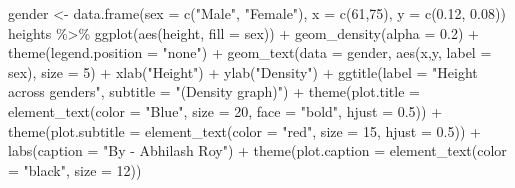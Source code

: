 \documentclass[
]{article}
\newenvironment{Shaded}{\begin{snugshade}}{\end{snugshade}}
\newcommand{\AttributeTok}[1]{\textcolor[rgb]{0.77,0.63,0.00}{#1}}
\newcommand{\DecValTok}[1]{\textcolor[rgb]{0.00,0.00,0.81}{#1}}
\newcommand{\FloatTok}[1]{\textcolor[rgb]{0.00,0.00,0.81}{#1}}
\newcommand{\FunctionTok}[1]{\textcolor[rgb]{0.00,0.00,0.00}{#1}}
\newcommand{\NormalTok}[1]{#1}
\newcommand{\OtherTok}[1]{\textcolor[rgb]{0.56,0.35,0.01}{#1}}
\newcommand{\SpecialCharTok}[1]{\textcolor[rgb]{0.00,0.00,0.00}{#1}}
\newcommand{\StringTok}[1]{\textcolor[rgb]{0.31,0.60,0.02}{#1}}
\begin{document}
\begin{Shaded}
\begin{Highlighting}[]
\NormalTok{gender }\OtherTok{\textless{}{-}} \FunctionTok{data.frame}\NormalTok{(}\AttributeTok{sex =} \FunctionTok{c}\NormalTok{(}\StringTok{"Male"}\NormalTok{, }\StringTok{"Female"}\NormalTok{), }\AttributeTok{x =} \FunctionTok{c}\NormalTok{(}\DecValTok{61}\NormalTok{,}\DecValTok{75}\NormalTok{), }\AttributeTok{y =} \FunctionTok{c}\NormalTok{(}\FloatTok{0.12}\NormalTok{, }\FloatTok{0.08}\NormalTok{))}
\NormalTok{heights }\SpecialCharTok{\%\textgreater{}\%} 
  \FunctionTok{ggplot}\NormalTok{(}\FunctionTok{aes}\NormalTok{(height, }\AttributeTok{fill =}\NormalTok{ sex)) }\SpecialCharTok{+} \FunctionTok{geom\_density}\NormalTok{(}\AttributeTok{alpha =} \FloatTok{0.2}\NormalTok{) }\SpecialCharTok{+}
  \FunctionTok{theme}\NormalTok{(}\AttributeTok{legend.position =} \StringTok{"none"}\NormalTok{) }\SpecialCharTok{+}
  \FunctionTok{geom\_text}\NormalTok{(}\AttributeTok{data =}\NormalTok{ gender, }\FunctionTok{aes}\NormalTok{(x,y, }\AttributeTok{label =}\NormalTok{ sex), }\AttributeTok{size =} \DecValTok{5}\NormalTok{) }\SpecialCharTok{+}
  \FunctionTok{xlab}\NormalTok{(}\StringTok{"Height"}\NormalTok{) }\SpecialCharTok{+} \FunctionTok{ylab}\NormalTok{(}\StringTok{"Density"}\NormalTok{) }\SpecialCharTok{+}
  \FunctionTok{ggtitle}\NormalTok{(}\AttributeTok{label =} \StringTok{"Height across genders"}\NormalTok{, }\AttributeTok{subtitle =} \StringTok{"(Density graph)"}\NormalTok{) }\SpecialCharTok{+}
  \FunctionTok{theme}\NormalTok{(}\AttributeTok{plot.title =} \FunctionTok{element\_text}\NormalTok{(}\AttributeTok{color =} \StringTok{"Blue"}\NormalTok{, }\AttributeTok{size =} \DecValTok{20}\NormalTok{, }
                                  \AttributeTok{face =} \StringTok{"bold"}\NormalTok{, }\AttributeTok{hjust =} \FloatTok{0.5}\NormalTok{)) }\SpecialCharTok{+}
  \FunctionTok{theme}\NormalTok{(}\AttributeTok{plot.subtitle =} \FunctionTok{element\_text}\NormalTok{(}\AttributeTok{color =} \StringTok{"red"}\NormalTok{, }\AttributeTok{size =} \DecValTok{15}\NormalTok{, }\AttributeTok{hjust =} \FloatTok{0.5}\NormalTok{)) }\SpecialCharTok{+}
  \FunctionTok{labs}\NormalTok{(}\AttributeTok{caption =} \StringTok{"By {-} Abhilash Roy"}\NormalTok{) }\SpecialCharTok{+}
  \FunctionTok{theme}\NormalTok{(}\AttributeTok{plot.caption =} \FunctionTok{element\_text}\NormalTok{(}\AttributeTok{color =} \StringTok{"black"}\NormalTok{, }\AttributeTok{size =} \DecValTok{12}\NormalTok{)) }
\end{Highlighting}
\end{Shaded}
\end{document}
